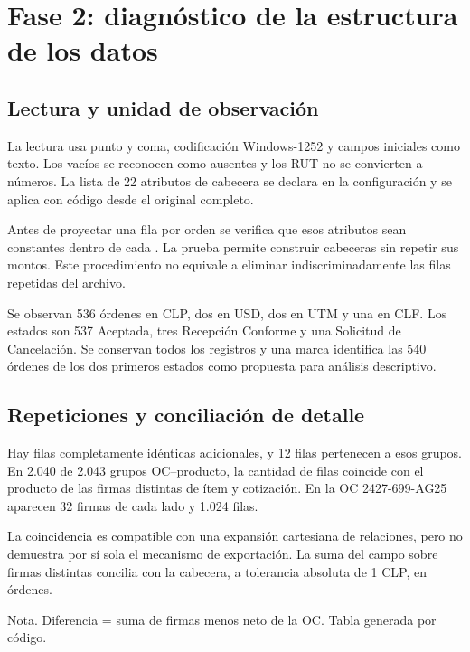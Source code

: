 \documentclass[12pt,letterpaper]{article}
\newcommand{\archivo}[1]{\path{#1}}
\begin{document}
\section{Fase 2: diagnóstico de la estructura de los datos}

\subsection{Lectura y unidad de observación}

La lectura usa punto y coma, codificación Windows-1252 y campos iniciales como texto.
Los vacíos se reconocen como ausentes y los RUT no se convierten a números.
La lista de 22 atributos de cabecera se declara en la configuración y se aplica
con código desde el original completo.

Antes de proyectar una fila por orden se verifica que esos atributos sean constantes
dentro de cada \archivo{codigoOC}. La prueba permite construir \Ordenes{} cabeceras
sin repetir sus montos. Este procedimiento no equivale a eliminar indiscriminadamente
las filas repetidas del archivo.

Se observan 536 órdenes en CLP, dos en USD, dos en UTM y una en CLF. Los estados son
537 Aceptada, tres Recepción Conforme y una Solicitud de Cancelación. Se conservan
todos los registros y una marca identifica las 540 órdenes de los dos primeros
estados como propuesta para análisis descriptivo.

\subsection{Repeticiones y conciliación de detalle}

Hay \DuplicadosAdicionales{} filas completamente idénticas adicionales, y 12 filas
pertenecen a esos grupos. En 2.040 de 2.043 grupos OC--producto, la cantidad de filas
coincide con el producto de las firmas distintas de ítem y cotización. En la OC
2427-699-AG25 aparecen 32 firmas de cada lado y 1.024 filas.

La coincidencia es compatible con una expansión cartesiana de relaciones, pero
no demuestra por sí sola el mecanismo de exportación. La suma del campo
\archivo{MontoNetoItemCLP} sobre firmas distintas concilia con la cabecera, a
tolerancia absoluta de 1 CLP, en \OrdenesConciliadas{} órdenes.

\begin{table}[H]
\caption{Órdenes cuyo detalle de firmas distintas no concilia}
\label{tab:excepciones}
\small\singlespacing

\par\smallskip
{\footnotesize Nota. Diferencia = suma de firmas menos neto de la OC. Tabla generada por código.}
\end{table}
\end{document}
